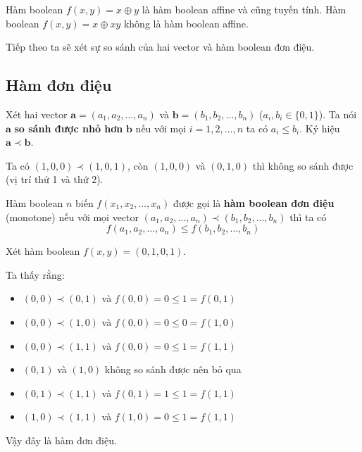 \begin{example}
    Hàm boolean $f(x, y) = x \oplus y$ là hàm boolean affine và cũng tuyến tính. Hàm boolean $f(x, y) = x \oplus xy$ không là hàm boolean affine.
\end{example}

Tiếp theo ta sẽ xét sự so sánh của hai vector và hàm boolean đơn điệu.

\subsection*{Hàm đơn điệu}

\begin{definition}
    Xét hai vector $\bm{a} = (a_1, a_2, \ldots, a_n)$ và $\bm{b} = (b_1, b_2, \ldots, b_n)$ ($a_i, b_i \in \{0, 1\}$). 
    Ta nói $\bm{a}$ \textbf{so sánh được nhỏ hơn} $\bm{b}$ nếu với mọi $i = 1, 2, \ldots, n$
    ta có $a_i \leqslant b_i$. Ký hiệu $\bm{a} \prec \bm{b}$.
\end{definition}

\begin{example}
    Ta có $(1, 0, 0) \prec (1, 0, 1)$, còn $(1, 0, 0)$ và $(0, 1, 0)$
    thì không so sánh được (vị trí thứ 1 và thứ 2).
\end{example}

\begin{definition}
    Hàm boolean $n$ biến $f(x_1, x_2, \ldots, x_n)$ được gọi là \textbf{hàm boolean đơn điệu} (monotone) nếu với mọi vector $(a_1, a_2, \ldots, a_n) \prec (b_1, b_2, \ldots, b_n)$ thì ta có 
    \begin{equation}
        f(a_1, a_2, \ldots, a_n) \leqslant f(b_1, b_2, \ldots, b_n)  
    \end{equation}
\end{definition}

\begin{example}
    Xét hàm boolean $f(x, y) = (0, 1, 0, 1)$.

    Ta thấy rằng:
    \begin{itemize}
        \item $(0, 0) \prec (0, 1)$ và $f(0, 0) = 0 \leqslant 1 = f(0, 1)$
        \item $(0, 0) \prec (1, 0)$ và $f(0, 0) = 0 \leqslant 0 = f(1, 0)$
        \item $(0, 0) \prec (1, 1)$ và $f(0, 0) = 0 \leqslant 1 = f(1, 1)$
        \item $(0, 1)$ và $(1, 0)$ không so sánh được nên bỏ qua
        \item $(0, 1) \prec (1, 1)$ và $f(0, 1) = 1 \leqslant 1 = f(1, 1)$
        \item $(1, 0) \prec (1, 1)$ và $f(1, 0) = 0 \leqslant 1 = f(1, 1)$
    \end{itemize}

    Vậy đây là hàm đơn điệu.
\end{example}

